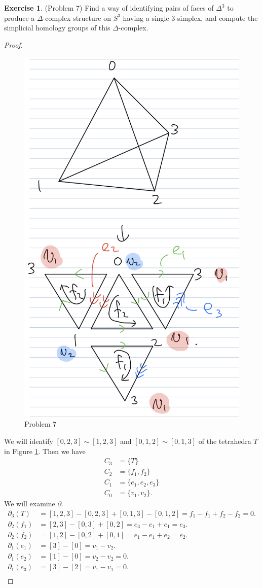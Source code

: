\documentclass[12pt, psamsfonts]{amsart}
\theoremstyle{definition}
\newtheorem*{exer}{Exercise}
\theoremstyle{remark}
\numberwithin{equation}{section}
\begin{document}
\begin{exer}{(Problem 7)}
  Find a way of identifying pairs of faces of $\Delta^3$ to produce a $\Delta$-complex structure on $S^3$ having a single 3-simplex, and compute the simplicial homology groups of this $\Delta$-complex.
\end{exer}

\begin{proof}
  \begin{figure}
    \includegraphics[width=.5\linewidth]{problem7.jpeg}
    \caption{Problem 7}
    \label{fig:problem7}
  \end{figure}
  We will identify $[0, 2, 3] \sim [1, 2, 3]$ and $[0, 1, 2] \sim [0, 1, 3]$ of the tetrahedra $T$ in Figure \ref{fig:problem7}.
  Then we have
  \begin{align*}
    C_3 &= \{ T \} \\
    C_2 &= \{ f_1, f_2 \} \\
    C_1 &= \{ e_1, e_2, e_3 \} \\
    C_0 &= \{ v_1, v_2 \}.
  \end{align*}
  We will examine $\partial$.
  \begin{align*}
    \partial_3(T) &= [1, 2, 3] - [0, 2, 3] + [0, 1, 3] - [0, 1, 2] = f_1 - f_1 + f_2 - f_2 = 0. \\
    \partial_2(f_1) &= [2, 3] - [0, 3] + [0, 2] = e_3 - e_1 + e_1 = e_3. \\
    \partial_2(f_2) &= [1, 2] - [0, 2] + [0, 1] = e_1 - e_1 + e_2 = e_2. \\
    \partial_1(e_1) &= [3] - [0] = v_1 - v_2. \\
    \partial_1(e_2) &= [1] - [0] = v_2 - v_2 = 0. \\
    \partial_1(e_3) &= [3] - [2] = v_1 - v_1 = 0. \\
  \end{align*}


\end{proof}
\end{document}
